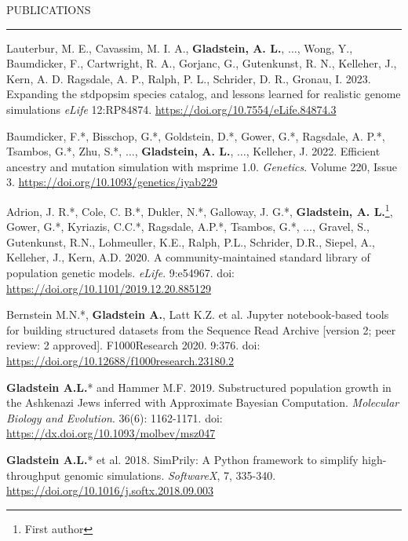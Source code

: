 \documentclass{resume} %
\renewenvironment{rSection}[1]{
\sectionskip
\textcolor{RoyalPurple}{\MakeUppercase{#1}}
\sectionlineskip
\hrule
\begin{list}{}{
\setlength{\leftmargin}{1.5em}
}
\item[]
}{
\end{list}
}
\begin{document}
\begin{rSection}{Publications}

\item Lauterbur, M. E., Cavassim, M. I. A., \textbf{Gladstein, A. L.}, $\ldots$, Wong, Y., Baumdicker, F., Cartwright, R. A., Gorjanc, G., Gutenkunst, R. N., Kelleher, J., Kern, A. D. Ragsdale, A. P., Ralph, P. L., Schrider, D. R., Gronau, I. 2023. Expanding the stdpopsim species catalog, and lessons learned for realistic genome simulations \textit{eLife} 12:RP84874. \url{https://doi.org/10.7554/eLife.84874.3}

\item Baumdicker, F.*, Bisschop, G.*, Goldstein, D.*, Gower, G.*, Ragsdale, A. P.*, Tsambos, G.*, Zhu, S.*, $\ldots$, \textbf{Gladstein, A. L.}, $\ldots$, Kelleher, J. 2022. Efficient ancestry and mutation simulation with msprime 1.0. \textit{Genetics}. Volume 220, Issue 3. \url{https://doi.org/10.1093/genetics/iyab229}

\item Adrion, J. R.*, Cole, C. B.*, Dukler, N.*, Galloway, J. G.*, \textbf{Gladstein, A. L.}\footnote{First author}, Gower, G.*, Kyriazis, C.C.*, Ragsdale, A.P.*, Tsambos, G.*, $\ldots$, Gravel, S., Gutenkunst, R.N., Lohmeuller, K.E., Ralph, P.L., Schrider, D.R., Siepel, A., Kelleher, J., Kern, A.D. 2020. A community-maintained standard library of population genetic models. \textit{eLife}. 9:e54967. doi: \url{https://doi.org/10.1101/2019.12.20.885129}

\item Bernstein M.N.*, \textbf{Gladstein A.}, Latt K.Z. et al. Jupyter notebook-based tools for building structured datasets from the Sequence Read Archive [version 2; peer review: 2 approved]. F1000Research 2020. 9:376. doi: \url{https://doi.org/10.12688/f1000research.23180.2}

\item \textbf{Gladstein A.L.}* and Hammer M.F. 2019. Substructured population growth in the Ashkenazi Jews inferred with Approximate Bayesian Computation. \textit{Molecular Biology and Evolution}. 36(6): 1162-1171. doi: \url{https://dx.doi.org/10.1093/molbev/msz047}

\item \textbf{Gladstein A.L.}* et al. 2018. SimPrily: A Python framework to simplify high-throughput genomic simulations. \textit{SoftwareX}, 7, 335-340. \url{https://doi.org/10.1016/j.softx.2018.09.003}



\end{rSection}
\end{document}
